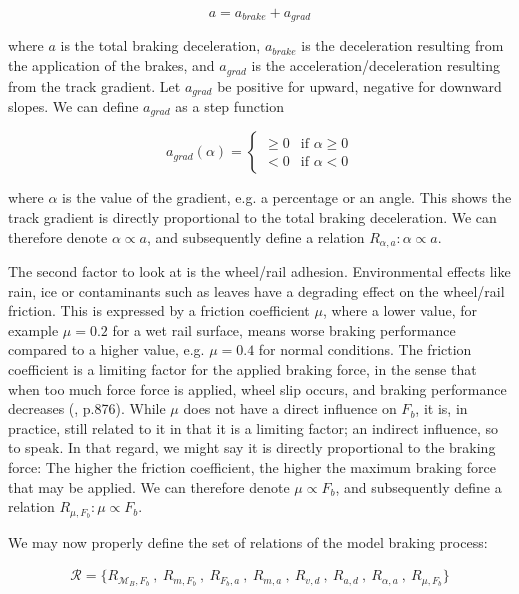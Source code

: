 \begin{equation}
\label{eq:deceleration}
a = a_{brake} + a_{grad}
\end{equation}

\noindent
where $a$ is the total braking deceleration, $a_{brake}$ is the deceleration resulting from the application of the brakes, and $a_{grad}$ is the acceleration/deceleration resulting from the track gradient. Let $a_{grad}$ be positive for upward, negative for downward slopes. We can define $a_{grad}$ as a step function

\begin{equation}
\label{eq:gradientdeceleration}
a_{grad}(\alpha) =
\begin{cases}
\geq 0 & \text{if $\alpha \geq 0$} \\
< 0 & \text{if $\alpha < 0$}
\end{cases}
\end{equation}

\noindent
where $\alpha$ is the value of the gradient, e.g. a percentage or an angle. This shows the track gradient is directly proportional to the total braking deceleration. We can therefore denote $\alpha \propto a$, and subsequently define a relation $R_{\alpha,a}: \alpha \propto a$.
\par
The second factor to look at is the wheel/rail adhesion. Environmental effects like rain, ice or contaminants such as leaves have a degrading effect on the wheel/rail friction. This is expressed by a friction coefficient $\mu$, where a lower value, for example $\mu = 0.2$ for a wet rail surface, means worse braking performance compared to a higher value, e.g. $\mu = 0.4$ for normal conditions. The friction coefficient is a limiting factor for the applied braking force, in the sense that when too much force force is applied, wheel slip occurs, and braking performance decreases (\cite{Bosso2006}, p.876). While $\mu$ does not have a direct influence on $F_{b}$, it is, in practice, still related to it in that it is a limiting factor; an indirect influence, so to speak. In that regard, we might say it is directly proportional to the braking force: The higher the friction coefficient, the higher the maximum braking force that may be applied. We can therefore denote $\mu \propto F_{b}$, and subsequently define a relation $R_{\mu,F_{b}}: \mu \propto F_{b}$.
\bigskip
\par\noindent
We may now properly define the set of relations of the model braking process:

\begin{align*}
{\mathcal{R}} = \{ R_{{\mathcal{M}}_{B},F_{b}} \:,\: R_{m,F_{b}} \:,\: R_{F_{b},a} \:,\: R_{m,a} \:,\: R_{v,d} \:,\: R_{a,d} \:,\: R_{\alpha,a} \:,\: R_{\mu,F_{b}} \}
\end{align*}

